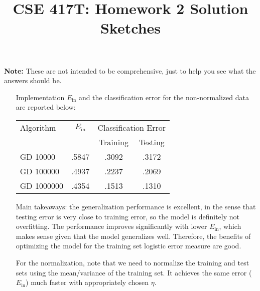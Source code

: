 \documentclass[10pt]{article}
\begin{document}
\title{CSE 417T: Homework 2 Solution Sketches}



\maketitle

\noindent \textbf{Note:} These are not intended to be comprehensive,
just to help you see what the answers should be.

\begin{enumerate}

\item[Implementation] $E_{\text{in}}$ and the classification error for the
  non-normalized data are reported below:

  \begin{center}
  \begin{tabular}{l|c|c|c}
    Algorithm & $E_{\text{in}}$ & \multicolumn{2}{c}{Classification
      Error} \\
    & & Training & Testing \\ \hline
    GD 10000 & .5847 & .3092 & .3172 \\
    GD 100000 & .4937 & .2237 & .2069 \\
    GD 1000000 & .4354 & .1513 & .1310 \\
  \end{tabular}
  \end{center}

  Main takeaways: the generalization performance is excellent, in the
  sense that testing error is very close to training error, so the
  model is definitely not overfitting. The performance improves
  significantly with lower $E_{\text{in}}$, which makes sense given
  that the model generalizes well. Therefore, the benefits of
  optimizing the model for the training set logistic error measure are
  good. 

  For the normalization, note that we need to normalize the training 
  and test sets using the mean/variance of the training set.
  It achieves the
  same error ($E_{\text{in}}$) much faster with appropriately chosen $\eta$.


\end{enumerate}
\end{document}
